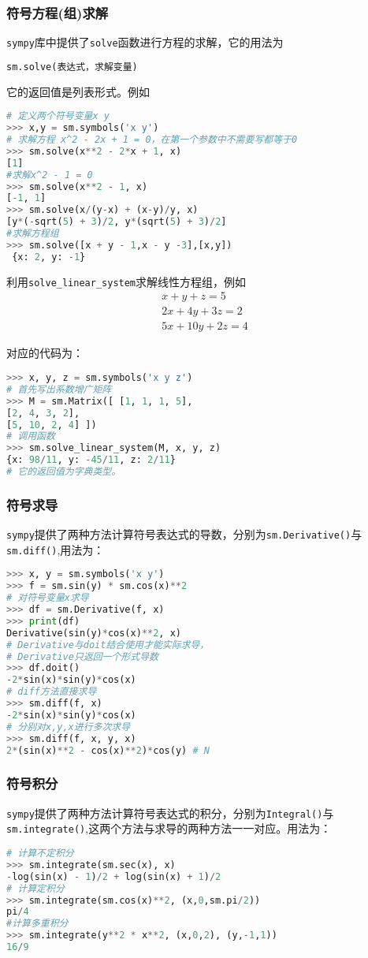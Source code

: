 \subsubsection{符号方程(组)求解}
\verb|sympy|库中提供了\verb|solve|函数进行方程的求解，它的用法为
\begin{lstlisting}[language=python]
sm.solve(表达式，求解变量)
\end{lstlisting}
它的返回值是列表形式。例如
\begin{lstlisting}[language=python]
# 定义两个符号变量x y
>>> x,y = sm.symbols('x y')
# 求解方程 x^2 - 2x + 1 = 0，在第一个参数中不需要写都等于0
>>> sm.solve(x**2 - 2*x + 1, x)
[1] 
#求解x^2 - 1 = 0
>>> sm.solve(x**2 - 1, x)
[-1, 1]
>>> sm.solve(x/(y-x) + (x-y)/y, x)
[y*(-sqrt(5) + 3)/2, y*(sqrt(5) + 3)/2]
#求解方程组
>>> sm.solve([x + y - 1,x - y -3],[x,y])
 {x: 2, y: -1}
\end{lstlisting}

利用\verb|solve_linear_system|求解线性方程组，例如
\begin{align}
x+y+z=5 \\
2 x+4 y+3 z=2 \\
5 x+10 y+2 z=4
\end{align}

对应的代码为：
\begin{lstlisting}[language=python]
>>> x, y, z = sm.symbols('x y z')
# 首先写出系数增广矩阵
>>> M = sm.Matrix([ [1, 1, 1, 5],
[2, 4, 3, 2],
[5, 10, 2, 4] ])
# 调用函数
>>> sm.solve_linear_system(M, x, y, z)
{x: 98/11, y: -45/11, z: 2/11}
# 它的返回值为字典类型。
\end{lstlisting}

\subsubsection{符号求导}
\verb|sympy|提供了两种方法计算符号表达式的导数，分别为\verb|sm.Derivative()|与\verb|sm.diff()|,用法为：
\begin{lstlisting}[language=python]
>>> x, y = sm.symbols('x y')
>>> f = sm.sin(y) * sm.cos(x)**2
# 对符号变量x求导
>>> df = sm.Derivative(f, x)
>>> print(df)
Derivative(sin(y)*cos(x)**2, x)
# Derivative与doit结合使用才能实际求导，
# Derivative只返回一个形式导数
>>> df.doit() 
-2*sin(x)*sin(y)*cos(x)
# diff方法直接求导
>>> sm.diff(f, x)
-2*sin(x)*sin(y)*cos(x)
# 分别对x,y,x进行多次求导
>>> sm.diff(f, x, y, x)
2*(sin(x)**2 - cos(x)**2)*cos(y) # N
\end{lstlisting}

\subsubsection{符号积分}
\verb|sympy|提供了两种方法计算符号表达式的积分，分别为\verb|Integral()|与\verb|sm.integrate()|,这两个方法与求导的两种方法一一对应。用法为：
\begin{lstlisting}[language=python]
# 计算不定积分
>>> sm.integrate(sm.sec(x), x)
-log(sin(x) - 1)/2 + log(sin(x) + 1)/2
# 计算定积分
>>> sm.integrate(sm.cos(x)**2, (x,0,sm.pi/2))
pi/4
#计算多重积分
>>> sm.integrate(y**2 * x**2, (x,0,2), (y,-1,1))
16/9
\end{lstlisting}
